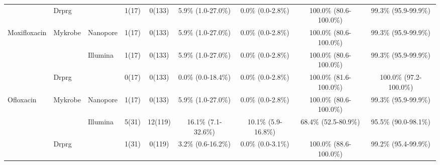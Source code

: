 \begin{table}
{\begin{tabular}{|l|l|l|c|c|c|c|c|c|}
                                & \multirow{-2}{*}{Drprg} &                            & 1(17)                          & 0(133)                          & 5.9\% (1.0-27.0\%)                          & 0.0\% (0.0-2.8\%)                           & 100.0\% (80.6-100.0\%)                         & 99.3\% (95.9-99.9\%)                           \\ \cline{2-2} \cline{4-9} 
\multirow{-3}{*}{Moxifloxacin}  & Mykrobe                 & \multirow{-2}{*}{Nanopore} & \cellcolor[HTML]{EFEFEF}1(17)  & \cellcolor[HTML]{EFEFEF}0(133)  & \cellcolor[HTML]{EFEFEF}5.9\% (1.0-27.0\%)  & \cellcolor[HTML]{EFEFEF}0.0\% (0.0-2.8\%)   & \cellcolor[HTML]{EFEFEF}100.0\% (80.6-100.0\%) & \cellcolor[HTML]{EFEFEF}99.3\% (95.9-99.9\%)   \\ \hline
                                &                         & Illumina                   & 1(17)                          & 0(133)                          & 5.9\% (1.0-27.0\%)                          & 0.0\% (0.0-2.8\%)                           & 100.0\% (80.6-100.0\%)                         & 99.3\% (95.9-99.9\%)                           \\ \cline{3-9} 
                                & \multirow{-2}{*}{Drprg} &                            & \cellcolor[HTML]{EFEFEF}0(17)  & \cellcolor[HTML]{EFEFEF}0(133)  & \cellcolor[HTML]{EFEFEF}0.0\% (0.0-18.4\%)  & \cellcolor[HTML]{EFEFEF}0.0\% (0.0-2.8\%)   & \cellcolor[HTML]{EFEFEF}100.0\% (81.6-100.0\%) & \cellcolor[HTML]{EFEFEF}100.0\% (97.2-100.0\%) \\ \cline{2-2} \cline{4-9} 
\multirow{-3}{*}{Ofloxacin}     & Mykrobe                 & \multirow{-2}{*}{Nanopore} & 1(17)                          & 0(133)                          & 5.9\% (1.0-27.0\%)                          & 0.0\% (0.0-2.8\%)                           & 100.0\% (80.6-100.0\%)                         & 99.3\% (95.9-99.9\%)                           \\ \hline
                                &                         & Illumina                   & \cellcolor[HTML]{EFEFEF}5(31)  & \cellcolor[HTML]{EFEFEF}12(119) & \cellcolor[HTML]{EFEFEF}16.1\% (7.1-32.6\%) & \cellcolor[HTML]{EFEFEF}10.1\% (5.9-16.8\%) & \cellcolor[HTML]{EFEFEF}68.4\% (52.5-80.9\%)   & \cellcolor[HTML]{EFEFEF}95.5\% (90.0-98.1\%)   \\ \cline{3-9} 
                                & \multirow{-2}{*}{Drprg} &                            & 1(31)                          & 0(119)                          & 3.2\% (0.6-16.2\%)                          & 0.0\% (0.0-3.1\%)                           & 100.0\% (88.6-100.0\%)                         & 99.2\% (95.4-99.9\%)                           \\ \cline{2-2} \cline{4-9} 

\end{tabular}}
\end{table}
